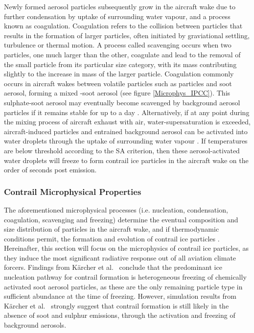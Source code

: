 Newly formed aerosol particles subsequently grow in the aircraft wake due to further condensation by uptake of surrounding water vapour, and a process known as coagulation. Coagulation refers to the collision between particles that results in the formation of larger particles, often initiated by graviational settling, turbulence or thermal motion. A process called scavenging occurs when two particles, one much larger than the other, coagulate and lead to the removal of the small particle from its particular size category, with its mass contributing slightly to the increase in mass of the larger particle. Coagulation commonly occurs in aircraft wakes between volatile particles such as  particles and soot aerosol, forming a mixed -soot aerosol (see figure \ref{Microphys_IPCC}). This sulphate-soot aerosol may eventually become scavenged by background aerosol particles if it remains stable for up to a day \cite{IPCC1999}. Alternatively, if at any point during the mixing process of aircraft exhaust with air, water-supersaturation is exceeded, aircraft-induced particles and entrained background aerosol can be activated into water droplets through the uptake of surrounding water vapour \cite{Karcher2018}. If temperatures are below threshold according to the SA criterion, then these aerosol-activated water droplets will freeze to form contrail ice particles in the aircraft wake on the order of seconds post emission. 

\subsubsection{Contrail Microphysical Properties}
The aforementioned microphysical processes (i.e. nucleation, condensation, coagulation, scavenging and freezing) determine the eventual composition and size distribution of particles in the aircraft wake, and if thermodynamic conditions permit, the formation and evolution of contrail ice particles \cite{AIR5715, Karcher2015}. Hereinafter, this section will focus on the microphysics of contrail ice particles, as they induce the most significant radiative response out of all aviation climate forcers. Findings from K{\"a}rcher et al.\ \cite{Karcher1996b} conclude that the predominant ice nucleation pathway for contrail formation is heterogeneous freezing of chemically activated soot aerosol particles, as these are the only remaining particle type in sufficient abundance at the time of freezing. However, simulation results from K{\"a}rcher et al.\ \cite{Karcher1998} strongly suggest that contrail formation is still likely in the absence of soot and sulphur emissions, through the activation and freezing of background aerosols. 

